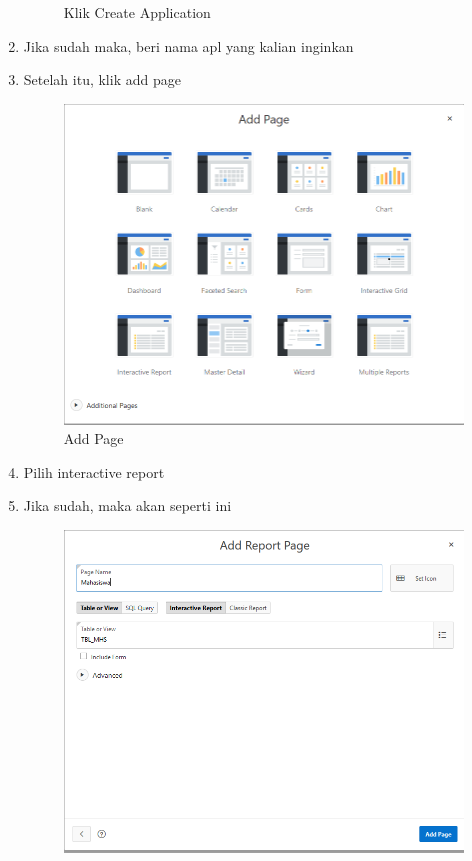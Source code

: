 \documentclass{article}
\begin{document}
\begin{enumerate}
\begin{figure}[!htbp]
        \caption{Klik Create Application}
    \end{figure}
    \item Jika sudah maka, beri nama apl yang kalian inginkan
    \item Setelah itu, klik add page
    \begin{figure}[!htbp]
        \centering
        \includegraphics[scale=0.4]{figure/addpage.PNG}
        \caption{Add Page}
    \end{figure}
\newpage
    \item Pilih interactive report
    \item Jika sudah, maka akan seperti ini
    \begin{figure}[!htbp]
        \centering
        \includegraphics[scale=0.4]{figure/createpage.PNG}

\end{figure}
\end{enumerate}
\end{document}
